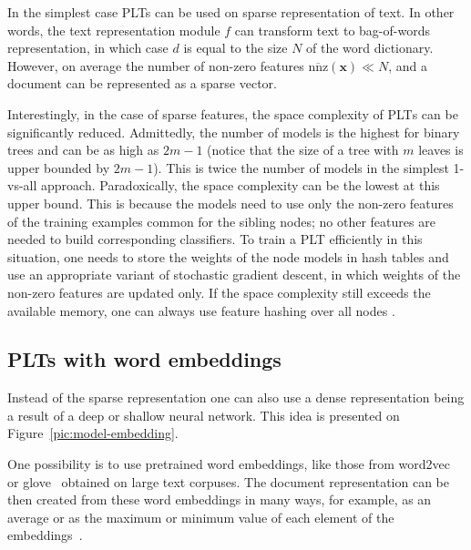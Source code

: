 \documentclass{article}
\newcommand{\Algo}[1]{\textsc{#1}}
\renewcommand{\vec}[1]{\boldsymbol{#1}}
\newcommand{\bx}{\vec{x}}
\newcommand{\sectionBefore}{-0pt}
\newcommand{\sectionAfter}{-0pt}
\begin{document}
In the simplest case PLTs can be used on sparse representation of text. In other words, the text representation module $f$ can transform text to bag-of-words representation, in which case $d$ is equal to the size $N$ of the word dictionary. However, on average the number of non-zero features $\overline{\mathrm{nnz}}(\bx) \ll N$, and a document can be represented as a sparse vector. 

Interestingly, in the case of sparse features, the space complexity of \Algo{PLT}s can be significantly reduced. Admittedly, the number of models is the highest for binary trees and can be as high as $2m-1$ (notice that the size of a tree with $m$ leaves is upper bounded by $2m-1$). This is twice the number of models in the simplest 1-vs-all approach. Paradoxically, the space complexity can be the lowest at this upper bound. This is because the models need to use only the non-zero features of the training examples common for the sibling nodes; no other features are needed to build corresponding classifiers. To train a \Algo{PLT} efficiently in this situation, one needs to store the weights of the node models in hash tables and use an appropriate variant of stochastic gradient descent, in which weights of the non-zero features are updated only. If the space complexity still exceeds the available memory, one can always use feature hashing over all nodes \cite{Weinberger_et_al_2009}.


\vspace{\sectionBefore}
\subsection{PLTs with word embeddings}
\label{sec:plt-word_embeddings}
\vspace{\sectionAfter}

Instead of the sparse representation one can also use a dense representation being a result of a deep or shallow neural network. This idea is presented on Figure~\ref{pic:model-embedding}.

One possibility is to use pretrained word embeddings, like those from word2vec~\citep{Mikolov_et_al_2013} or glove~\citep{Pennigton_et_al_2014} obtained on large text corpuses. The document representation can be then created from these word embeddings in many ways, for example, as an average or as the maximum or minimum value of each element of the embeddings~\citep{De_Boom_et_al_2016}.
\end{document}
